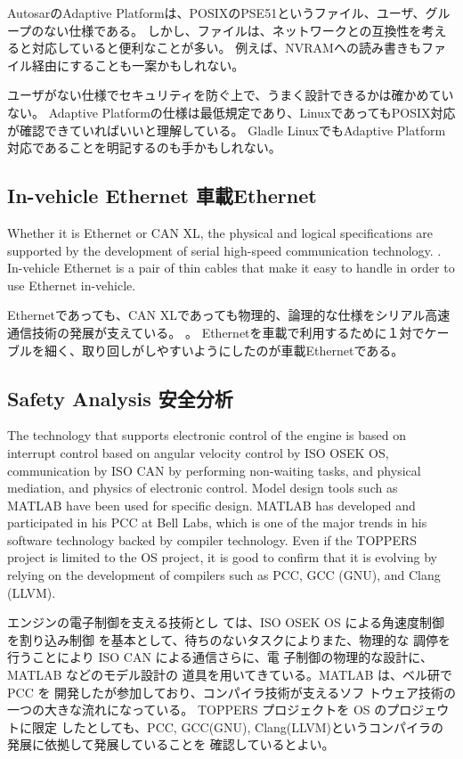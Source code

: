 \documentclass[twocolumn]{article} %
\begin{document}
AutosarのAdaptive Platformは、POSIXのPSE51というファイル、ユーザ、グループのない仕様である\cite{pse51}。
しかし、ファイルは、ネットワークとの互換性を考えると対応していると便利なことが多い。
例えば、NVRAMへの読み書きもファイル経由にすることも一案かもしれない。

ユーザがない仕様でセキュリティを防ぐ上で、うまく設計できるかは確かめていない。
Adaptive Platformの仕様は最低規定であり、LinuxであってもPOSIX対応が確認できていればいいと理解している。
Gladle LinuxでもAdaptive Platform対応であることを明記するのも手かもしれない。

\subsection{In-vehicle Ethernet 車載Ethernet}
Whether it is Ethernet or CAN XL, the physical and logical specifications are supported by the development of serial high-speed communication technology. \cite{networki}.
In-vehicle Ethernet is a pair of thin cables that make it easy to handle in order to use Ethernet in-vehicle. \cite{networki}

Ethernetであっても、CAN XLであっても物理的、論理的な仕様をシリアル高速通信技術の発展が支えている。\cite{networki} 。
Ethernetを車載で利用するために１対でケーブルを細く、取り回しがしやすいようにしたのが車載Ethernetである。\cite{networki} 


\subsection{Safety Analysis 安全分析}
The technology that supports electronic control of the engine is based on interrupt control based on angular velocity control by ISO OSEK OS, communication by ISO CAN by performing non-waiting tasks, and physical mediation, and physics of electronic control. Model design tools such as MATLAB have been used for specific design. MATLAB has developed and participated in his PCC at Bell Labs, which is one of the major trends in his software technology backed by compiler technology.
Even if the TOPPERS project is limited to the OS project, it is good to confirm that it is evolving by relying on the development of compilers such as PCC, GCC (GNU), and Clang (LLVM).

エンジンの電子制御を支える技術とし ては、ISO OSEK OS による角速度制御を割り込み制御 を基本として、待ちのないタスクによりまた、物理的な 調停を行うことにより ISO CAN による通信さらに、電 子制御の物理的な設計に、MATLAB などのモデル設計の 道具を用いてきている。MATLAB は、ベル研で PCC を 開発したが参加しており、コンパイラ技術が支えるソフ トウェア技術の一つの大きな流れになっている。
TOPPERS プロジェクトを OS のプロジェウトに限定 したとしても、PCC, GCC(GNU), Clang(LLVM)というコンパイラの発展に依拠して発展していることを 確認しているとよい。
\end{document}
